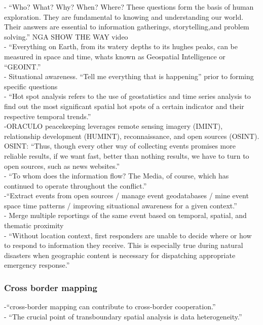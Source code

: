 -{\color{orange} “Who? What? Why? When? Where? These questions form the basis of human exploration. They are fundamental to knowing and understanding our world. Their answers are essential to information gatherings, storytelling,and problem solving.” NGA SHOW THE WAY video\cite{nga}}\\
-{\color{orange} “Everything on Earth, from its watery depths to its hughes peaks,  can be measured in space and time, whats known as Geospatial Intelligence or “GEOINT.”\cite{nga}}\\
-{\color{orange} Situational awareness. “Tell me everything that is happening” prior to forming specific questions \cite{Varanda2020}}\\
-{\color{orange} “Hot spot analysis refers to the use of geostatistics and time series analysis to find out the most significant spatial hot spots of a certain indicator and their respective temporal trends.”\cite{Varanda2020}}\\
-{\color{orange}ORACULO peacekeeping leverages remote sensing imagery (IMINT), relationship development (HUMINT), reconnaissance, and open sources (OSINT). OSINT: “Thus, though every other way of collecting events promises more reliable results, if we want fast, better than nothing results, we have to turn to open sources, such as news websites.”\cite{Varanda2020}}\\
-{\color{orange} “To whom does the information flow? The Media, of course, which has continued to operate throughout the conflict.”\cite{Varanda2020}}\\
-{\color{orange}“Extract events from open sources / manage event geodatabases / mine event space time patterns / improving situational awareness for a given context.”\cite{Varanda2020}}\\
-{\color{orange} Merge multiple reportings of the same event based on temporal, spatial, and thematic proximity\cite{Varanda2020}}\\
-{\color{orange} “Without location context, first responders are unable to decide where or how to respond to information they receive. This is especially true during natural disasters when geographic content is necessary for dispatching appropriate emergency response.”\cite{Snyder2019}}\\

\subsubsection{Cross border mapping}
-{\color{orange}“cross-border mapping can contribute to cross-border cooperation.”\cite{Witschas2004}}\\
-{\color{orange} “The crucial point of transboundary spatial analysis is data heterogeneity.”\cite{Witschas2004}}\\

